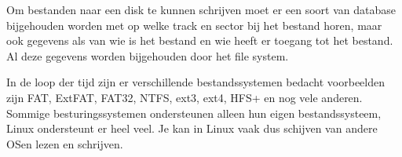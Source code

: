 Om bestanden naar een disk te kunnen schrijven moet er een soort van database bijgehouden worden met op welke track en sector bij het bestand horen, maar ook gegevens als van wie is het bestand en wie heeft er toegang tot het bestand. Al deze gegevens worden bijgehouden door het file system.

In de loop der tijd zijn er verschillende bestandssystemen bedacht voorbeelden zijn FAT, ExtFAT, FAT32, NTFS, ext3, ext4, HFS+ en nog vele anderen. Sommige besturingssystemen ondersteunen alleen hun eigen bestandssysteem, Linux ondersteunt er heel veel. Je kan in Linux vaak dus schijven van andere OSen lezen en schrijven.
